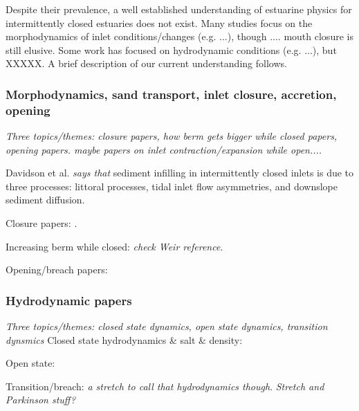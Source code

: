 Despite their prevalence, a well established understanding of estuarine physics for intermittently closed estuaries does not exist. Many studies focus on the morphodynamics of inlet conditions/changes (e.g. ...), though .... mouth closure is still elusive. Some work has focused on hydrodynamic conditions (e.g. ...), but XXXXX. A brief description of our current understanding follows.

\subsubsection{Morphodynamics, sand transport, inlet closure, accretion, opening}
\emph{Three topics/themes: closure papers, how berm gets bigger while closed papers, opening papers. maybe papers on inlet contraction/expansion while open....}

Davidson et al. \parencite*{davidson_simple_2009} \emph{says that} sediment infilling in intermittently closed inlets is due to three processes: littoral processes, tidal inlet flow asymmetries, and downslope sediment diffusion.

Closure papers: \parencite{ranasinghe_seasonal_2003, elwany_opening_1998, fortunato_morphological_2014, hanes_waves_2011, behrens_characterization_2009, behrens_episodic_2013}.

Increasing berm while closed: \parencite{baldock_morphodynamic_2008, laudier_measured_2011, weir_beach_2006} \emph{check Weir reference}. 

Opening/breach papers: \parencite{rich_hydrologic_2013, parkinson_breaching_2007, stretch_breaching_2006, elwany_opening_1998, fortunato_morphological_2014}

\subsubsection{Hydrodynamic papers}
\emph{Three topics/themes: closed state dynamics, open state dynamics, transition dynsmics}
Closed state hydrodynamics \& salt \& density: \parencite{cousins_hydrodynamics_2011, slinger_evolution_1990}

Open state: \parencite{largier_dynamics_1991}

Transition/breach:\parencite{becker_artificial_2009} \emph{a stretch to call that hydrodynamics though}.  \emph{Stretch and Parkinson stuff?}

